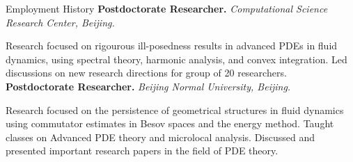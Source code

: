 
\begin{rubric}{Employment History}
	\entry*[\mydaterange{2022}{2023}]%
	\textbf{Postdoctorate Researcher.} \emph{Computational Science Research Center, Beijing.}

	Research focused on rigourous ill-posedness results in advanced PDEs in fluid dynamics, using spectral theory, harmonic analysis, and convex integration. Led discussions on new research directions for group of 20 researchers.
%
	 \entry*[\mydaterange{2019}{2021}]%
	 \textbf{Postdoctorate Researcher.} \emph{Beijing Normal University, Beijing.} 

	Research focused on the persistence of geometrical structures in fluid dynamics using commutator estimates in Besov spaces and the energy method. Taught classes on Advanced PDE theory and microlocal analysis. Discussed and presented important research papers in the field of PDE theory.
\end{rubric}

